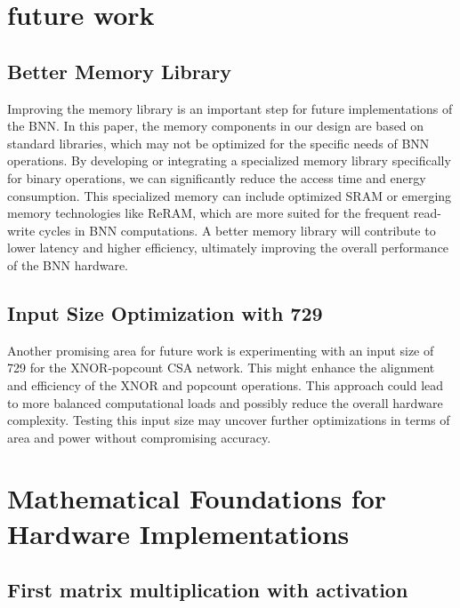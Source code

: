 \documentclass[conference]{IEEEtran}
\begin{document}
\section{future work}
\label{sec:future}
	\subsection{Better Memory Library}
Improving the memory library is an important step for future implementations of the BNN. In this paper, the memory components in our design are based on standard libraries, which may not be optimized for the specific needs of BNN operations. By developing or integrating a specialized memory library specifically for binary operations, we can significantly reduce the access time and energy consumption. This specialized memory can include optimized SRAM or emerging memory technologies like ReRAM, which are more suited for the frequent read-write cycles in BNN computations. A better memory library will contribute to lower latency and higher efficiency, ultimately improving the overall performance of the BNN hardware.

	\subsection{Input Size Optimization with 729}
Another promising area for future work is experimenting with an input size of 729 for the XNOR-popcount CSA network. This might enhance the alignment and efficiency of the XNOR and popcount operations. This approach could lead to more balanced computational loads and possibly reduce the overall hardware complexity. Testing this input size may uncover further optimizations in terms of area and power without compromising accuracy.

\printbibliography

\newpage


\appendix
\label{appendix}

\section{Mathematical Foundations for Hardware Implementations}

\label{appendix:bnn_maths}

\subsection{First matrix multiplication with activation}
\end{document}
